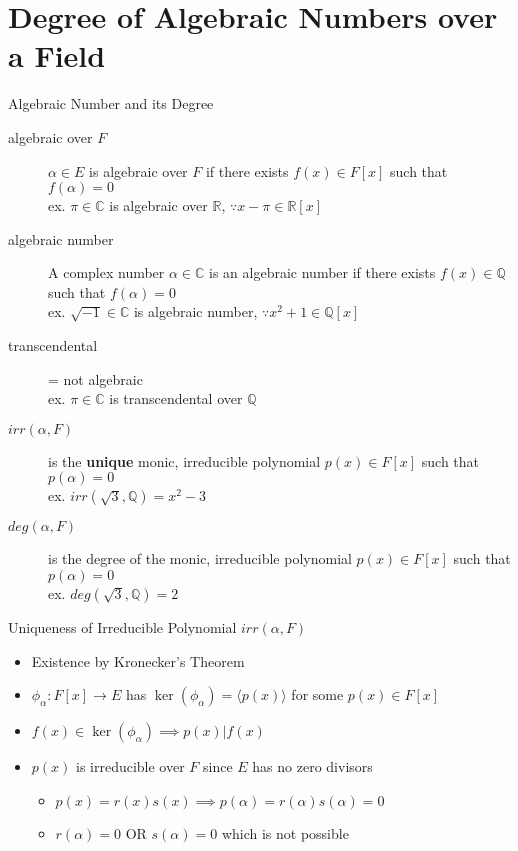 \documentclass{beamer}
\newcommand{\ideal}[1]{\langle #1 \rangle}
\begin{document}
\section{Degree of Algebraic Numbers over a Field}
\begin{frame}{Algebraic Number and its Degree}
\begin{description}
	\item[algebraic over $F$] $\alpha \in E$ is algebraic over $F$ if there exists $f(x) \in F[x]$ such that $f(\alpha) = 0$ \\
		{\color{blue}ex. $\pi \in \mathbb{C}$ is algebraic over $\mathbb{R}$, $\because x-\pi \in \mathbb{R}[x]$}
	\item[algebraic number] A complex number $\alpha \in \mathbb{C}$ is an algebraic number if there exists $f(x) \in \mathbb{Q}$ such that $f(\alpha) = 0$\\
		{\color{blue}ex. $\sqrt{-1} \in \mathbb{C}$ is algebraic number, $\because x^2+1 \in \mathbb{Q}[x]$}
	\item[transcendental] = not algebraic \\
		{\color{blue}ex. $\pi \in \mathbb{C}$ is transcendental over $\mathbb{Q}$}
	\item[$irr(\alpha,F)$] is the \textbf{unique} monic, irreducible polynomial $p(x) \in F[x]$ such that $p(\alpha) = 0$\\
		{ \color{blue} ex. $irr(\sqrt{3},\mathbb{Q}) = x^2-3$ }
	\item[$deg(\alpha,F)$] is the degree of the monic, irreducible polynomial $p(x) \in F[x]$ such that $p(\alpha) = 0$\\
		{\color{blue} ex. $deg(\sqrt{3},\mathbb{Q}) = 2$ }
\end{description}
\end{frame}

\begin{frame}{Uniqueness of Irreducible Polynomial $irr(\alpha,F)$}
\begin{itemize}
	\item Existence by Kronecker's Theorem
	\item $\phi_\alpha : F[x] \to E$ has $\ker(\phi_\alpha) = \ideal{p(x)}$ for some $p(x) \in F[x]$
	\item $f(x) \in \ker(\phi_\alpha) \implies p(x)|f(x)$
	\item $p(x)$ is irreducible over $F$ since $E$ has no zero divisors
	\begin{itemize}
		\item $p(x) = r(x)s(x) \implies p(\alpha) = r(\alpha)s(\alpha) = 0$
		\item $r(\alpha) = 0$ OR $s(\alpha) = 0$ which is not possible
	\end{itemize}
\end{itemize}
\end{frame}
\end{document}
